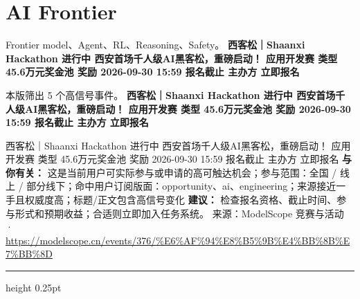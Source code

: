 \documentclass[10.5pt]{ctexart}
\begin{document}
\section*{AI Frontier}
{\color{ormuted} Frontier model、Agent、RL、Reasoning、Safety。}
\vspace{2mm}
{\LARGE\bfseries 西客松｜Shaanxi Hackathon 进行中 西安首场千人级AI黑客松，重磅启动！ 应用开发赛 类型 45.6万元奖金池 奖励 2026-09-30 15:59 报名截止 主办方 立即报名}\par
\vspace{1mm}
{\color{ormuted} 本版筛出 5 个高信号事件。}
\vspace{3mm}
{\Large\bfseries 西客松｜Shaanxi Hackathon 进行中 西安首场千人级AI黑客松，重磅启动！ 应用开发赛 类型 45.6万元奖金池 奖励 2026-09-30 15:59 报名截止 主办方 立即报名}\par
西客松｜Shaanxi Hackathon 进行中 西安首场千人级AI黑客松，重磅启动！ 应用开发赛 类型 45.6万元奖金池 奖励 2026-09-30 15:59 报名截止 主办方 立即报名
\textbf{与你有关：} 这是当前用户可实际参与或申请的高可触达机会；参与范围：全国 / 线上 / 部分线下；命中用户订阅版面：opportunity、ai、engineering；来源接近一手且权威度高；标题/正文包含高信号变化
\textbf{建议：} 检查报名资格、截止时间、参与形式和预期收益；合适则立即加入任务系统。
{\footnotesize\color{ormuted} 来源：ModelScope 竞赛与活动 · \url{https://modelscope.cn/events/376/%E6%AF%94%E8%B5%9B%E4%BB%8B%E7%BB%8D}}
\vspace{4mm}
\hrule height 0.25pt
\vspace{3mm}
\end{document}
